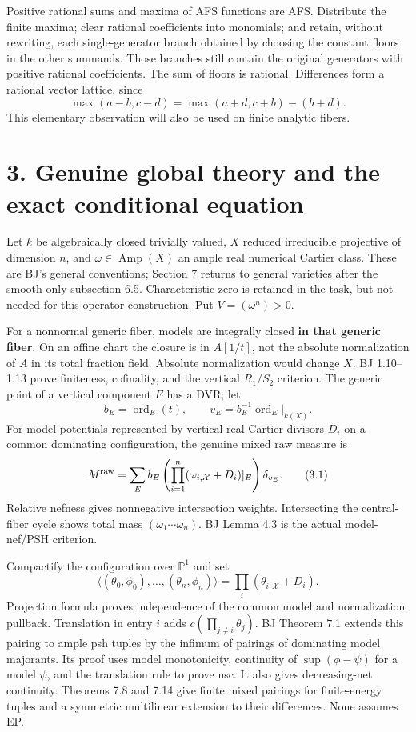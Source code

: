 \documentclass[
  10pt,
]{article}
\begin{document}
Positive rational sums and maxima of AFS functions are AFS. Distribute
the finite maxima; clear rational coefficients into monomials; and
retain, without rewriting, each single-generator branch obtained by
choosing the constant floors in the other summands. Those branches still
contain the original generators with positive rational coefficients. The
sum of floors is rational. Differences form a rational vector lattice,
since \[\max(a-b,c-d)=\max(a+d,c+b)-(b+d).\] This elementary observation
will also be used on finite analytic fibers.

\section{3. Genuine global theory and the exact conditional
equation}\label{genuine-global-theory-and-the-exact-conditional-equation}

Let \(k\) be algebraically closed trivially valued, \(X\) reduced
irreducible projective of dimension \(n\), and
\(\omega\in\operatorname{Amp}(X)\) an ample real numerical Cartier
class. These are BJ's general conventions; Section 7 returns to general
varieties after the smooth-only subsection 6.5. Characteristic zero is
retained in the task, but not needed for this operator construction. Put
\(V=(\omega^n)>0\).

For a nonnormal generic fiber, models are integrally closed \textbf{in
that generic fiber}. On an affine chart the closure is in \(A[1/t]\),
not the absolute normalization of \(A\) in its total fraction field.
Absolute normalization would change \(X\). BJ 1.10--1.13 prove
finiteness, cofinality, and the vertical \(R_1/S_2\) criterion. The
generic point of a vertical component \(E\) has a DVR; let
\[b_E=\operatorname{ord}_E(t),\qquad v_E=b_E^{-1}\operatorname{ord}_E|_{k(X)}.\]
For model potentials represented by vertical real Cartier divisors
\(D_i\) on a common dominating configuration, the genuine mixed raw
measure is \[M^{\rm raw}=\sum_E b_E\left(\prod_{i=1}^n
                (\omega_{i,\mathcal X}+D_i)|_E\right)\delta_{v_E}. \tag{3.1}\]
Relative nefness gives nonnegative intersection weights. Intersecting
the central-fiber cycle shows total mass \((\omega_1\cdots\omega_n)\).
BJ Lemma 4.3 is the actual model-nef/PSH criterion.

Compactify the configuration over \(\mathbb P^1\) and set
\[\langle(\theta_0,\phi_0),\ldots,(\theta_n,\phi_n)\rangle
       =\prod_i(\theta_{i,\overline{\mathcal X}}+D_i).\] Projection
formula proves independence of the common model and normalization
pullback. Translation in entry \(i\) adds \(c(\prod_{j\ne i}\theta_j)\).
BJ Theorem 7.1 extends this pairing to ample psh tuples by the infimum
of pairings of dominating model majorants. Its proof uses model
monotonicity, continuity of \(\sup(\phi-\psi)\) for a model \(\psi\),
and the translation rule to prove usc. It also gives decreasing-net
continuity. Theorems 7.8 and 7.14 give finite mixed pairings for
finite-energy tuples and a symmetric multilinear extension to their
differences. None assumes EP.
\end{document}
